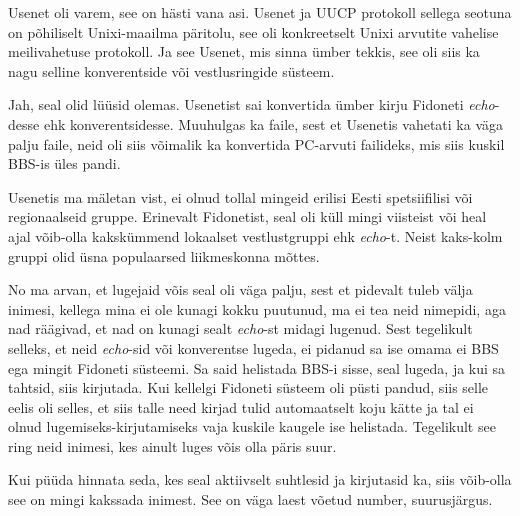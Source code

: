 
Usenet oli varem, see on hästi vana asi. Usenet ja UUCP protokoll sellega 
seotuna on põhiliselt  Unixi-maailma päritolu,  see oli konkreetselt 
Unixi arvutite vahelise meilivahetuse protokoll. Ja see Usenet, mis  sinna 
ümber tekkis,  see oli siis ka nagu selline konverentside või vestlusringide 
süsteem.


Jah, seal olid lüüsid olemas. Usenetist sai konvertida ümber kirju Fidoneti 
\emph{echo}-desse ehk konverentsidesse. Muuhulgas ka faile, sest et 
Usenetis vahetati ka väga palju faile,  neid oli siis võimalik ka konvertida 
PC-arvuti failideks, mis siis kuskil BBS-is üles pandi.


Usenetis ma mäletan vist, ei olnud tollal mingeid erilisi Eesti spetsiifilisi või 
regionaalseid gruppe. Erinevalt Fidonetist, seal oli küll mingi viisteist või 
heal ajal võib-olla kakskümmend lokaalset  vestlustgruppi ehk \emph{echo}-t. 
Neist kaks-kolm gruppi olid üsna populaarsed liikmeskonna mõttes.


No ma arvan, et lugejaid võis seal oli väga palju, sest et pidevalt tuleb välja 
inimesi, kellega mina ei ole kunagi kokku puutunud, ma ei tea neid nimepidi, 
aga nad räägivad, et nad on kunagi sealt \emph{echo}-st  midagi lugenud. Sest 
tegelikult selleks, et neid \emph{echo}-sid või konverentse lugeda,  ei pidanud 
sa ise omama ei BBS ega mingit Fidoneti süsteemi. Sa said helistada BBS-i 
sisse, seal lugeda, ja kui sa tahtsid, siis kirjutada. Kui kellelgi Fidoneti süsteem 
oli püsti pandud, siis selle eelis oli selles, et siis talle need kirjad tulid 
automaatselt koju kätte ja tal ei olnud lugemiseks-kirjutamiseks vaja kuskile 
kaugele ise helistada. Tegelikult see ring  neid inimesi, kes  ainult luges 
võis olla päris suur. 

Kui püüda hinnata seda, kes seal aktiivselt suhtlesid ja kirjutasid ka, siis  
võib-olla see on mingi kakssada inimest. See on väga laest võetud number, 
suurusjärgus.


